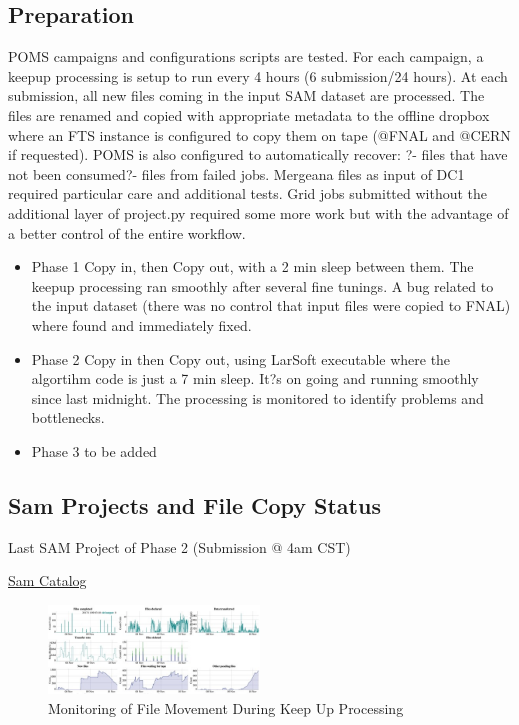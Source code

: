 \documentclass[pdftex,12pt,letter]{article}
\begin{document}
\subsection {Preparation}

POMS campaigns and configurations scripts are tested.
For each campaign, a keepup processing is setup to run every 4 hours (6 submission/24 hours).
At each submission, all new files coming in the input SAM dataset are processed.
The files are renamed and copied with appropriate metadata to the offline dropbox where an FTS instance is configured to copy them on tape (@FNAL and @CERN if requested).
POMS is also configured to automatically  recover:  ?- files that have not been consumed?- files from failed jobs.
Mergeana files as input of DC1 required particular care and additional tests.
Grid jobs submitted  without the additional layer of project.py required some more work but with the advantage of a better control of the entire workflow.

\begin{itemize}
\item Phase 1 
Copy in, then Copy out, with a 2 min sleep between them.
The keepup processing ran smoothly after several fine tunings.
A bug related to the input dataset (there was no control that input files were copied to FNAL) where found and immediately fixed.

\item Phase 2 
Copy in then  Copy out, using LarSoft executable where the algortihm code is just a 7 min sleep. It?s on going and running smoothly since last midnight.
The processing is monitored to identify problems and bottlenecks.

\item Phase 3
\color{red} to be added
\color{black}

\end{itemize}

\subsection {Sam Projects and File Copy Status}
Last SAM Project of Phase 2 (Submission @ 4am CST)

\href{http://samweb.fnal.gov:8480/station_monitor/dune/stations/dune/projects/dunepro-null_lar.sh_20171110_040116_3425472}{Sam Catalog}



\begin{figure}[tbh]
  \centering
  \includegraphics[width=0.5\textwidth]{./ReportImages/SamProjectsKeepupoutput.jpg}
  \caption{Monitoring of File Movement During Keep Up Processing}
  \label{fig:FTSKeepUPProcessing}
\end{figure}
\end{document}
